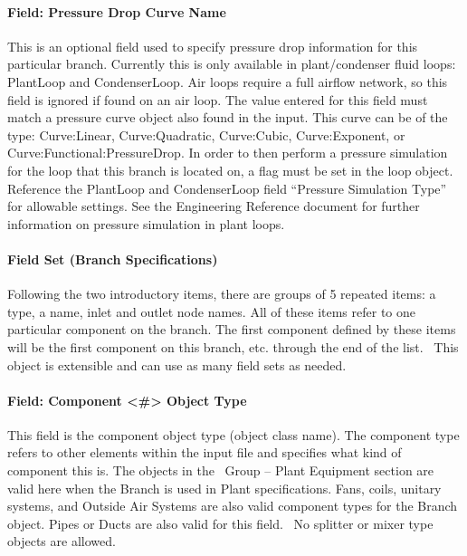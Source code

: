 \paragraph{Field: Pressure Drop Curve Name}\label{field-pressure-drop-curve-name}

This is an optional field used to specify pressure drop information for this particular branch. Currently this is only available in plant/condenser fluid loops: PlantLoop and CondenserLoop. Air loops require a full airflow network, so this field is ignored if found on an air loop. The value entered for this field must match a pressure curve object also found in the input. This curve can be of the type: Curve:Linear, Curve:Quadratic, Curve:Cubic, Curve:Exponent, or Curve:Functional:PressureDrop. In order to then perform a pressure simulation for the loop that this branch is located on, a flag must be set in the loop object. Reference the PlantLoop and CondenserLoop field ``Pressure Simulation Type'' for allowable settings. See the Engineering Reference document for further information on pressure simulation in plant loops.

\paragraph{Field Set (Branch Specifications)}\label{field-set-branch-specifications}

Following the two introductory items, there are groups of 5 repeated items: a type, a name, inlet and outlet node names. All of these items refer to one particular component on the branch. The first component defined by these items will be the first component on this branch, etc. through the end of the list.~ This object is extensible and can use as many field sets as needed.

\paragraph{Field: Component \textless{}\#\textgreater{} Object Type}\label{field-component-object-type-000}

This field is the component object type (object class name). The component type refers to other elements within the input file and specifies what kind of component this is. The objects in the~ Group -- Plant Equipment section are valid here when the Branch is used in Plant specifications. Fans, coils, unitary systems, and Outside Air Systems are also valid component types for the Branch object. Pipes or Ducts are also valid for this field.~ No splitter or mixer type objects are allowed.

